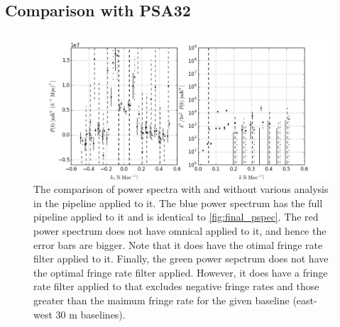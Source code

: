 \documentclass[twocolumn,numberedappendix]{emulateapj} \shorttitle{PSA64}
\begin{document}
\subsection{Comparison with PSA32}
%
%
%

\begin{figure}[t!]\centering
\includegraphics[width=2\columnwidth]{plots/pspec_comparison.png}
\caption{The comparison of power spectra with and without various analysis in
the pipeline applied to it. The blue power spectrum has the full pipeline
applied to it and is identical to \ref{fig:final_pspec}. The red power spectrum
does not have omnical applied to it, and hence the error bars are bigger. Note
that it does have the otimal fringe rate filter applied to it. Finally, the
green power sepctrum does not have the optimal fringe rate filter applied.
However, it does have a fringe rate filter applied to that excludes negative
fringe rates and those greater than the maimum fringe rate for the given
baseline (east-west 30 m baselines). }
\label{fig:pspec_comp}
\end{figure}
\end{document}
